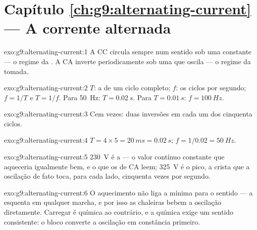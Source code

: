 \section*{Capítulo \ref{ch:g9:alternating-current} --- A corrente alternada}

\begin{solution}{exo:g9:alternating-current:1}
A CC circula sempre num sentido sob uma  constante --- o regime
da . A CA inverte periodicamente sob uma  que oscila --- o
regime da tomada.
\end{solution}

\begin{solution}{exo:g9:alternating-current:2}
$T$: a  de um ciclo completo; $f$: os ciclos por segundo;
$f = 1/T$ e $T = 1/f$. Para \qty{50}{Hz}: $T = \qty{0.02}{s}$. Para
$T = \qty{0.01}{s}$: $f = \qty{100}{Hz}$.
\end{solution}

\begin{solution}{exo:g9:alternating-current:3}
Cem vezes: duas inversões em cada um dos cinquenta ciclos.
\end{solution}

\begin{solution}{exo:g9:alternating-current:4}
$T = 4 \times 5 = \qty{20}{ms} = \qty{0.02}{s}$;
$f = 1/0.02 = \qty{50}{Hz}$.
\end{solution}

\begin{solution}{exo:g9:alternating-current:5}
\qty{230}{V} é a  --- o valor contínuo constante que
aqueceria igualmente bem, e o que os  de CA leem;
\qty{325}{V} é o pico, a crista que a oscilação de fato toca, para
cada lado, cinquenta vezes por segundo.
\end{solution}

\begin{solution}{exo:g9:alternating-current:6}
O aquecimento não liga a mínima para o sentido --- a 
esquenta em qualquer marcha, e por isso as chaleiras bebem a
oscilação diretamente. Carregar é química ao contrário, e a química
exige um sentido consistente: o bloco converte a oscilação em
constância primeiro.
\end{solution}

